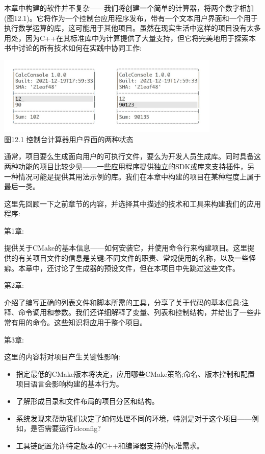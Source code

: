 

本章中构建的软件并不复杂——我们将创建一个简单的计算器，将两个数字相加(图12.1)。它将作为一个控制台应用程序发布，带有一个文本用户界面和一个用于执行数学运算的库，这可能用于其他项目。虽然在现实生活中这样的项目没有太多用处，因为C++在其标准库中为计算提供了大量支持，但它将完美地用于探索本书中讨论的所有技术如何在实践中协同工作:

\begin{center}
\includegraphics[width=0.8\textwidth]{content/3/chapter12/images/1.jpg}\\
图12.1 控制台计算器用户界面的两种状态
\end{center}

通常，项目要么生成面向用户的可执行文件，要么为开发人员生成库。同时具备这两种功能的项目比较少见——一些应用程序提供独立的SDK或库来支持插件，另一种情况可能是提供其用法示例的库。我们在本章中构建的项目在某种程度上属于最后一类。

这里先回顾一下之前章节的内容，并选择其中描述的技术和工具来构建我们的应用程序:

第1章:

提供关于CMake的基本信息——如何安装它，并使用命令行来构建项目。这里提供的有关项目文件的信息是关键:不同文件的职责、常规使用的名称，以及一些怪癖。本章中，还讨论了生成器的预设文件，但在本项目中先跳过这些文件。

第2章:

介绍了编写正确的列表文件和脚本所需的工具，分享了关于代码的基本信息:注释、命令调用和参数。我们还详细解释了变量、列表和控制结构，并给出了一些非常有用的命令。这些知识将应用于整个项目。

第3章:

这里的内容将对项目产生关键性影响:

\begin{itemize}
\item 
指定最低的CMake版本将决定，应用哪些CMake策略;命名、版本控制和配置项目语言会影响构建的基本行为。

\item 
了解形成目录和文件布局的项目分区和结构。

\item 
系统发现来帮助我们决定了如何处理不同的环境，特别是对于这个项目——例如，是否需要运行ldconfig?

\item 
工具链配置允许特定版本的C++和编译器支持的标准需求。
\end{itemize}

